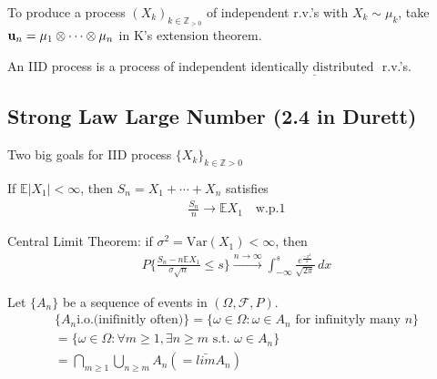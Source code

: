 \documentclass[11pt]{article}
\begin{document}
To produce a process $(X_k)_{k \in \mathbb{Z}_{>0}}$ of independent r.v.'s with $X_k \sim  \mu_k$,
take ${\mathbf{u}}_{n} = \mu_1 \otimes\cdots\otimes \mu_n$ in K's extension theorem.

\begin{definition}
    An IID process is a process of independent $\underline{\text{identically distributed }}$ r.v.'s.
\end{definition}


\subsection{Strong Law Large Number (2.4 in Durett)}

Two big goals for IID process $\{ X_k \}_{k \in \mathbb{Z} > 0}$
\begin{theorem}
    If $\mathbb{E}|X_1| < \infty$, then $S_n = X_1+ \cdots +X_n$ satisfies
    \begin{align*}
        \frac{S_n}{n} \longrightarrow \mathbb{E}X_1 \quad \text{w.p.}1
    \end{align*}
\end{theorem}

\begin{theorem}
    Central Limit Theorem: if $\sigma^{2} = \text{Var}(X_1) < \infty $, then 
    \begin{align*}
        P \{  \frac{S_n - n\mathbb{E}X_1}{\sigma \sqrt{n}} \le s \} \xrightarrow{n \to \infty}
        \int_{-\infty}^{s}\frac{e^{\frac{-x^{2}}{2}}}{\sqrt{2 \pi}}\,dx
    \end{align*}
\end{theorem}

\begin{definition}
    Let $\{ A_n \}$ be a sequence of events in $(\Omega, \mathcal{F}, P)$.
    \begin{align*}
        \{ A_n \text{i.o.(inifinitly often)} \} = \{ \omega \in \Omega: \omega \in A_n
        \text{ for infinityly many }n \}\\
        = \{ \omega \in \Omega: \forall m \ge 1, \exists n \ge m \text{ s.t. } \omega \in A_n \}\\
        = \bigcap _{m\ge 1}\bigcup _{n\ge m} A_n(= \bar{lim}A_n)
    \end{align*}
\end{definition}
\end{document}
